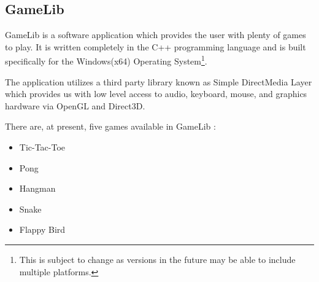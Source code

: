 \documentclass[12pt]{article}
\begin{document}
		\subsection{GameLib}
		\begin{flushleft}
			\setlength{\parindent}{10ex}
			GameLib is a software application which provides the user with plenty of games to play. It is written completely in the C++ programming language and is built specifically for the Windows(x64) Operating System\footnote{This is subject to change as versions in the future may be able to include multiple platforms.}. \par
			The application utilizes a third party library known as Simple DirectMedia Layer which provides us with low level access to audio, keyboard, mouse, and graphics hardware via OpenGL and Direct3D. \par
			\noindent There are, at present, five games available in GameLib :
			\begin{itemize}
				\item Tic-Tac-Toe
				\item Pong
				\item Hangman
				\item Snake
				\item Flappy Bird
			\end{itemize}
		\end{flushleft}
		
		\clearpage
		
\end{document}

